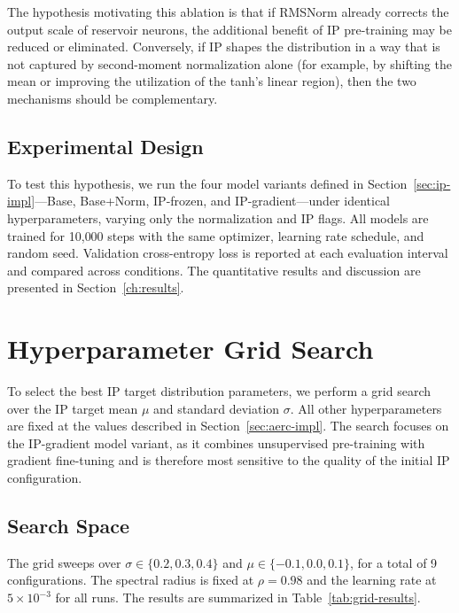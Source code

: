 \documentclass{sapthesis}
\begin{document}
The hypothesis motivating this ablation is that if RMSNorm already corrects the output scale of reservoir neurons, the additional benefit of IP pre-training may be reduced or eliminated. Conversely, if IP shapes the distribution in a way that is not captured by second-moment normalization alone (for example, by shifting the mean or improving the utilization of the tanh's linear region), then the two mechanisms should be complementary.

\subsection{Experimental Design}
To test this hypothesis, we run the four model variants defined in Section~\ref{sec:ip-impl}---Base, Base+Norm, IP-frozen, and IP-gradient---under identical hyperparameters, varying only the normalization and IP flags. All models are trained for 10{,}000 steps with the same optimizer, learning rate schedule, and random seed. Validation cross-entropy loss is reported at each evaluation interval and compared across conditions. The quantitative results and discussion are presented in Section~\ref{ch:results}.

\section{Hyperparameter Grid Search}
\label{sec:grid-search}
To select the best IP target distribution parameters, we perform a grid search over the IP target mean $\mu$ and standard deviation $\sigma$. All other hyperparameters are fixed at the values described in Section~\ref{sec:aerc-impl}. The search focuses on the IP-gradient model variant, as it combines unsupervised pre-training with gradient fine-tuning and is therefore most sensitive to the quality of the initial IP configuration.

\subsection{Search Space}
The grid sweeps over $\sigma \in \{0.2, 0.3, 0.4\}$ and $\mu \in \{-0.1, 0.0, 0.1\}$, for a total of 9 configurations. The spectral radius is fixed at $\rho = 0.98$ and the learning rate at $5 \times 10^{-3}$ for all runs. The results are summarized in Table~\ref{tab:grid-results}.
\end{document}

